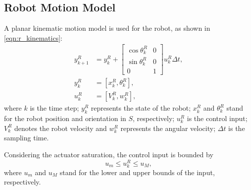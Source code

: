 \documentclass[twocolumn,10pt]{asme2e}
\newcommand{\todonote}[1]{\vspace{0px} %
\todo[inline, color=green!30]{\textbf{[Note:]} {#1}} %
}
\begin{document}
\subsection*{Robot Motion Model}
A planar kinematic motion model is used for the robot, as shown in \cref{eqn:r_kinematics}:
\begin{subequations}\label{eqn:r_kinematics}
	\begin{align}
		y^R_{k+1}&=y^R_{k}+
		\begin{bmatrix}
		\cos{\theta^R_{k}} & 0\\
		\sin{\theta^R_{k}} & 0\\
		0 & 1
		\end{bmatrix}u^R_{k}\Delta t,\\
		y^R_k&=[x^R_k,\theta^R_k]\label{eqn:r_state},\\
		u^R_k&=[V^R_k,w^R_k]\label{eqn:r_input},
	\end{align}
\end{subequations}
where $k$ is the time step; 
$y^R_{k}$ represents the state of the robot; 
$x^R_k$ and $\theta^R_k$ stand for the robot position and orientation in $\mathit{S}$, respectively;
$u^R_k$ is the control input;
$V^R_k$ denotes the robot velocity and $w^R_k$ represents the angular velocity;
$\Delta t$ is the sampling time.

%	
Considering the actuator saturation, the control input is bounded by
\begin{equation*}
	u_m\le u^R_{k}\le u_M,
\end{equation*}
where $u_m$ and $u_M$ stand for the lower and upper bounds of the input, respectively.
\end{document}
